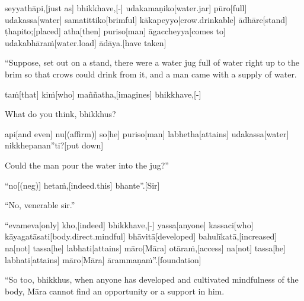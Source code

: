 \begin{samepage}
\begingl[glneveryline={\PaliGlossA,\PaliGlossB}]
seyyathāpi,[just as] bhikkhave,[-] udakamaṇiko[water.jar] pūro[full] udakassa[water] samatittiko[brimful] kākapeyyo[crow.drinkable] ādhāre[stand] ṭhapito;[placed] atha[then] puriso[man] āgaccheyya[comes to] udakabhāraṁ[water.load] ādāya.[have taken]
\endgl
\nopagebreak
\linespread{0.5}
\begin{spacin}{0.2}
{\PaliGlossFT “Suppose, set out on a stand, there were a water jug full of water right up to the brim so that crows could drink from it, and a man came with a supply of water.}
\end{spacin}
\vskip 12pt
\end{samepage}
\begin{samepage}
\begingl[glneveryline={\PaliGlossA,\PaliGlossB}]
taṁ[that] kiṁ[who] maññatha,[imagines] bhikkhave,[-]
\endgl
\nopagebreak
\linespread{0.5}
\begin{spacin}{0.2}
{\PaliGlossFT What do you think, bhikkhus?}
\end{spacin}
\vskip 12pt
\end{samepage}
\begin{samepage}
\begingl[glneveryline={\PaliGlossA,\PaliGlossB}]
api[and even] nu[(affirm)] so[he] puriso[man] labhetha[attains] udakassa[water] nikkhepanan”ti?[put down]
\endgl
\nopagebreak
\linespread{0.5}
\begin{spacin}{0.2}
{\PaliGlossFT Could the man pour the water into the jug?”}
\end{spacin}
\vskip 12pt
\end{samepage}
\begin{samepage}
\begingl[glneveryline={\PaliGlossA,\PaliGlossB}]
“no[(neg)] hetaṁ,[indeed.this] bhante”.[Sir]
\endgl
\nopagebreak
\linespread{0.5}
\begin{spacin}{0.2}
{\PaliGlossFT “No, venerable sir.”}
\end{spacin}
\vskip 12pt
\end{samepage}
\begin{samepage}
\begingl[glneveryline={\PaliGlossA,\PaliGlossB}]
“evameva[only] kho,[indeed] bhikkhave,[-] yassa[anyone] kassaci[who] kāyagatāsati[body.direct.mindful] bhāvitā[developed] bahulīkatā,[increased] na[not] tassa[he] labhati[attains] māro[Māra] otāraṁ,[access] na[not] tassa[he] labhati[attains] māro[Māra] ārammaṇaṁ”.[foundation]
\endgl
\nopagebreak
\linespread{0.5}
\begin{spacin}{0.2}
{\PaliGlossFT “So too, bhikkhus, when anyone has developed and cultivated mindfulness of the body, Māra cannot find an opportunity or a support in him.}
\end{spacin}
\vskip 12pt
\end{samepage}
